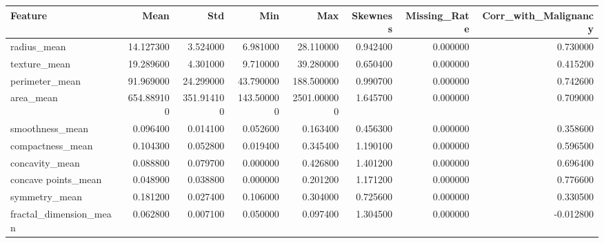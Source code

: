 \begin{tabular}{lrrrrrrr}
\toprule
Feature & Mean & Std & Min & Max & Skewness & Missing_Rate & Corr_with_Malignancy \\
\midrule
radius_mean & 14.127300 & 3.524000 & 6.981000 & 28.110000 & 0.942400 & 0.000000 & 0.730000 \\
texture_mean & 19.289600 & 4.301000 & 9.710000 & 39.280000 & 0.650400 & 0.000000 & 0.415200 \\
perimeter_mean & 91.969000 & 24.299000 & 43.790000 & 188.500000 & 0.990700 & 0.000000 & 0.742600 \\
area_mean & 654.889100 & 351.914100 & 143.500000 & 2501.000000 & 1.645700 & 0.000000 & 0.709000 \\
smoothness_mean & 0.096400 & 0.014100 & 0.052600 & 0.163400 & 0.456300 & 0.000000 & 0.358600 \\
compactness_mean & 0.104300 & 0.052800 & 0.019400 & 0.345400 & 1.190100 & 0.000000 & 0.596500 \\
concavity_mean & 0.088800 & 0.079700 & 0.000000 & 0.426800 & 1.401200 & 0.000000 & 0.696400 \\
concave points_mean & 0.048900 & 0.038800 & 0.000000 & 0.201200 & 1.171200 & 0.000000 & 0.776600 \\
symmetry_mean & 0.181200 & 0.027400 & 0.106000 & 0.304000 & 0.725600 & 0.000000 & 0.330500 \\
fractal_dimension_mean & 0.062800 & 0.007100 & 0.050000 & 0.097400 & 1.304500 & 0.000000 & -0.012800 \\
\bottomrule
\end{tabular}
